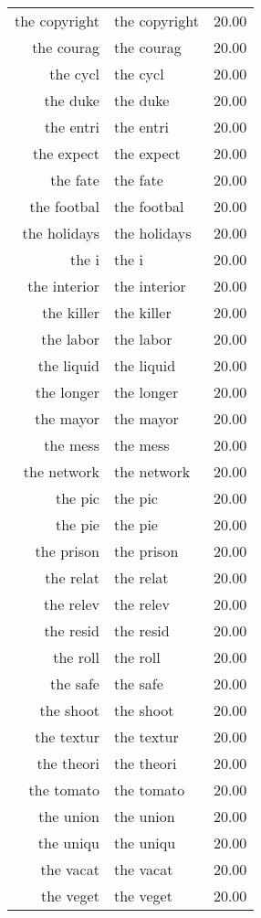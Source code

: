 \begin{table}[ht]
\begin{tabular}{rlr}
  the copyright & the copyright & 20.00 \\ 
  the courag & the courag & 20.00 \\ 
  the cycl & the cycl & 20.00 \\ 
  the duke & the duke & 20.00 \\ 
  the entri & the entri & 20.00 \\ 
  the expect & the expect & 20.00 \\ 
  the fate & the fate & 20.00 \\ 
  the footbal & the footbal & 20.00 \\ 
  the holidays & the holidays & 20.00 \\ 
  the i & the i & 20.00 \\ 
  the interior & the interior & 20.00 \\ 
  the killer & the killer & 20.00 \\ 
  the labor & the labor & 20.00 \\ 
  the liquid & the liquid & 20.00 \\ 
  the longer & the longer & 20.00 \\ 
  the mayor & the mayor & 20.00 \\ 
  the mess & the mess & 20.00 \\ 
  the network & the network & 20.00 \\ 
  the pic & the pic & 20.00 \\ 
  the pie & the pie & 20.00 \\ 
  the prison & the prison & 20.00 \\ 
  the relat & the relat & 20.00 \\ 
  the relev & the relev & 20.00 \\ 
  the resid & the resid & 20.00 \\ 
  the roll & the roll & 20.00 \\ 
  the safe & the safe & 20.00 \\ 
  the shoot & the shoot & 20.00 \\ 
  the textur & the textur & 20.00 \\ 
  the theori & the theori & 20.00 \\ 
  the tomato & the tomato & 20.00 \\ 
  the union & the union & 20.00 \\ 
  the uniqu & the uniqu & 20.00 \\ 
  the vacat & the vacat & 20.00 \\ 
  the veget & the veget & 20.00 \\ 

\end{tabular}
\end{table}
